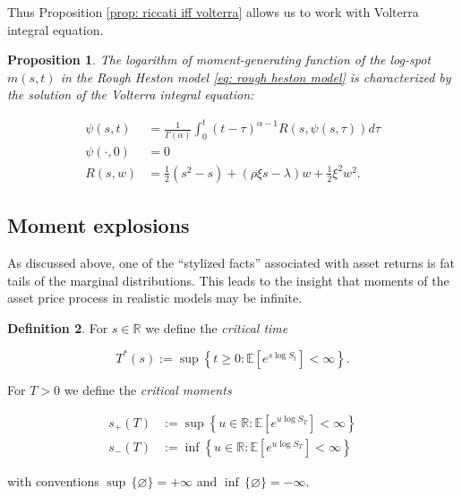 \documentclass[12pt,twoside]{article}
\theoremstyle{plain}
\theoremstyle{plain}
\newtheorem{proposition}{Proposition}[section]
\theoremstyle{definition}
\newtheorem{definition}[proposition]{Definition}
\theoremstyle{remark}
\numberwithin{equation}{section}
\begin{document}
Thus Proposition \ref{prop: riccati iff volterra} allows us to work with Volterra integral equation.

\begin{proposition}

The logarithm of moment-generating function of the log-spot $m(s, t)$ in the Rough Heston model \eqref{eq: rough heston model} is characterized by the solution of the Volterra integral equation:

\begin{equation}
\label{eq: original volterra equation}
\begin{aligned}
\psi(s,t) &= \frac{1}{\Gamma(\alpha)} \int _0^t (t-\tau)^{\alpha-1} R(s, \psi(s, \tau)) d\tau\\[10pt]
\psi(\cdot, 0) &= 0 \\
R(s, w) &= \frac{1}{2}\left(s^{2}-s\right)+(\rho \xi s - \lambda) w+\frac{1}{2} \xi ^{2} w^{2}.
\end{aligned}
\end{equation}

\end{proposition}

\subsection{Moment explosions}
\label{sec: moment explosions}

As discussed above, one of the ``stylized facts'' associated with asset returns is fat tails of the marginal distributions. This leads to the insight that moments of the asset price process in realistic models may be infinite.

\begin{definition}

For $s\in \mathbb R$ we define the \emph{critical time}

\begin{equation}
\label{eq: critical time}    
T^{*}(s):=\sup \left\{t \geq 0: \mathbb{E}\left[e^{s \log S_{t}}\right]<\infty\right\}.
\end{equation}

\vspace{10pt}

For $T>0$ we define the \emph{critical moments}

\begin{equation}
\label{eq: definition of critical moments}
\begin{aligned}
s_+(T)&:=\sup \left\{u \in \mathbb{R}: \mathbb{E}\left[e^{u \log S_{T}}\right]<\infty\right\} \\[5pt]
s_-(T)&:=\inf \left\{u \in \mathbb{R}: \mathbb{E}\left[e^{u \log S_{T}}\right]<\infty\right\}
\end{aligned}
\end{equation}

with conventions $\sup\,\{\varnothing\} = +\infty$ and $\inf\, \{\varnothing\} = -\infty$.

\end{definition}
\end{document}
